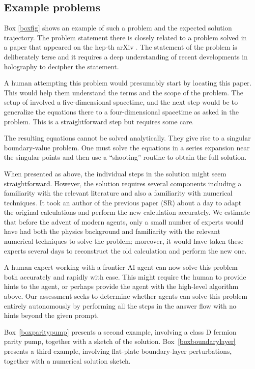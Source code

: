\documentclass[aps,prd,reprint,superscriptaddress,nofootinbib]{revtex4-2}
\begin{document}
\subsection{Example problems}
Box \ref{boxfig} shows an example of such a problem and the expected solution trajectory. The problem statement there is closely related to a problem solved in a paper that appeared on the hep-th arXiv \cite{Geng:2020fxl}. The statement of the problem is deliberately terse and it requires a deep understanding of recent developments in holography to decipher the statement. 

A human attempting this problem would presumably start by locating this paper. This would help them understand the terms and the scope of the problem. The setup of \cite{Geng:2020fxl} involved a five-dimensional spacetime, and the next step would be to generalize the equations there to a four-dimensional spacetime as asked in the problem. This is a straightforward step but requires some care. 

The resulting equations cannot be solved analytically. They give rise to a singular boundary-value problem. One must solve the equations in a series expansion near the singular points and then use a ``shooting'' routine \cite{press1992numerical} to obtain the full solution. 

When presented as above, the individual steps in the solution might seem straightforward. However, the solution requires several components including a familiarity with the relevant literature and also a familiarity with numerical techniques. It took an author of the previous paper (SR) about a day to adapt the original calculations and perform the new calculation accurately.  We estimate that before the advent of modern agents, only a small number of experts would have had both the physics background and familiarity with the relevant numerical techniques to solve the problem; moreover, it would have taken these experts several days to reconstruct the old calculation and perform the new one. 

A human expert working with a frontier AI agent can now solve this problem both accurately and rapidly with ease. This might require the human to provide hints to the agent, or perhaps provide the agent with the high-level algorithm above.  Our assessment seeks to determine whether agents can solve this problem entirely autonomously by performing all the steps in the answer flow with no hints beyond the given prompt.

Box~\ref{boxparitypump} presents a second example, involving a class D fermion parity pump, together with a sketch of the solution. Box~\ref{boxboundarylayer} presents a third example, involving flat-plate boundary-layer perturbations, together with a numerical solution sketch. 
\end{document}
